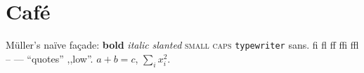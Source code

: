 \documentclass{article}
\begin{document}
\section{Café}
Müller's naïve façade: \textbf{bold} \textit{italic} \textsl{slanted} \textsc{small caps} \texttt{typewriter} \textsf{sans}. fi fl ff ffi ffl -- --- ``quotes'' ,,low''.
$a+b=c$, $\sum_{i}x_i^2$.
\end{document}
